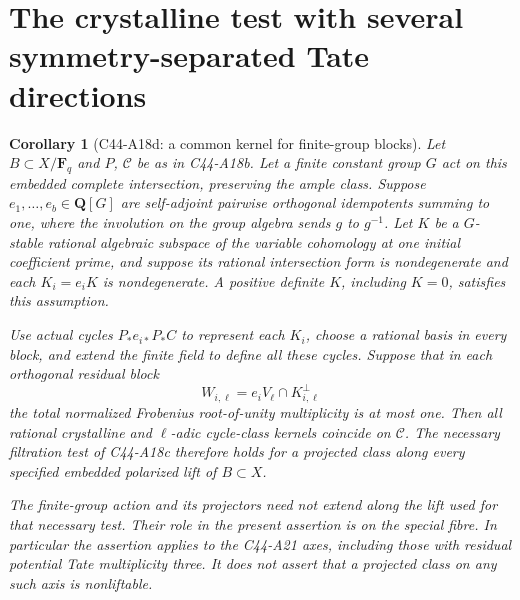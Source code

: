 \documentclass[11pt]{article}
\newtheorem{corollary}[theorem]{Corollary}
\theoremstyle{remark}\newtheorem{remark}[theorem]{Remark}
\begin{document}
\section{The crystalline test with several symmetry-separated Tate directions}
\label{sec:c44-a18d}

\begin{corollary}[C44-A18d: a common kernel for finite-group blocks]
Let $B\subset X/\mathbf F_q$ and $P$, $\mathscr C$ be as in
C44-A18b. Let a finite constant group $G$ act on this embedded
complete intersection, preserving the ample class. Suppose
$e_1,\ldots,e_b\in\mathbf Q[G]$ are self-adjoint pairwise
orthogonal idempotents summing to one, where the involution
on the group algebra sends $g$ to $g^{-1}$. Let $K$ be a
$G$-stable rational algebraic subspace of the variable
cohomology at one initial coefficient prime, and suppose
its rational intersection form is nondegenerate and each
$K_i=e_iK$ is nondegenerate. A positive definite $K$, including
$K=0$, satisfies this assumption.

Use actual cycles $P_*e_{i*}P_*C$ to represent each $K_i$,
choose a rational basis in every block, and extend the finite
field to define all these cycles. Suppose that in each
orthogonal residual block
\[
       W_{i,\ell}=e_iV_\ell\cap K_{i,\ell}^{\perp}
\]
the total normalized Frobenius root-of-unity multiplicity
is at most one. Then all rational crystalline and
$\ell$-adic cycle-class kernels coincide on $\mathscr C$.
The necessary filtration test of C44-A18c therefore holds
for a projected class along every specified embedded
polarized lift of $B\subset X$.

The finite-group action and its projectors need not extend
along the lift used for that necessary test. Their role in
the present assertion is on the special fibre. In particular
the assertion applies to the C44-A21 axes, including those
with residual potential Tate multiplicity three. It does
not assert that a projected class on any such axis is
nonliftable.
\end{corollary}
\end{document}
